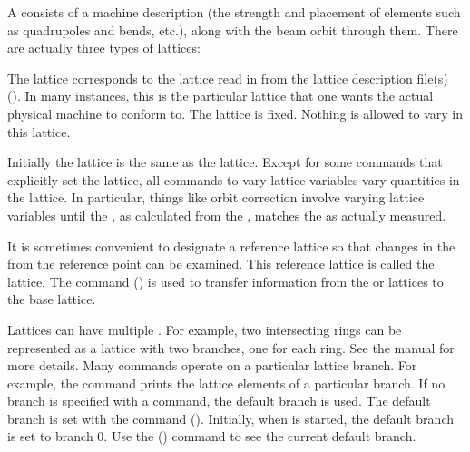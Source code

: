 A  consists of a machine description (the strength and
placement of elements such as quadrupoles and bends, etc.), along with the
beam orbit through them. There are actually three types of lattices:
  \vspace*{-3ex}
  \begin{description}
  \item[Design Lattice] \Newline 
The  lattice corresponds to the lattice read in from the
lattice description file(s) (). In many instances, this
is the particular lattice that one wants the actual physical machine
to conform to. The  lattice is fixed. Nothing is allowed to
vary in this lattice.
  \item[Model Lattice] \Newline
Initially the  lattice is the same as the  lattice. Except for some commands
that explicitly set the  lattice, all \tao commands to vary lattice variables vary
quantities in the  lattice. In particular, things like orbit correction involve varying
 lattice variables until the , as calculated from the , matches the
 as actually measured.
  \item[Base Lattice] \Newline
It is sometimes convenient to designate a reference lattice so that
changes in the  from the reference point can be examined.
This reference lattice is called the  lattice. The 
command () is used to transfer information from the
 or  lattices to the base lattice.
  \end{description}

Lattices can have multiple . For example, two
intersecting rings can be represented as a lattice with two branches,
one for each ring. See the \bmad manual for more details. Many \tao
commands operate on a particular lattice branch. For example, the
 command prints the lattice elements of a particular
branch. If no branch is specified with a command, the default branch
is used. The default branch is set with the 
command (). Initially, when \tao is started, the default
branch is set to branch 0. Use the  ()
command to see the current default branch.

